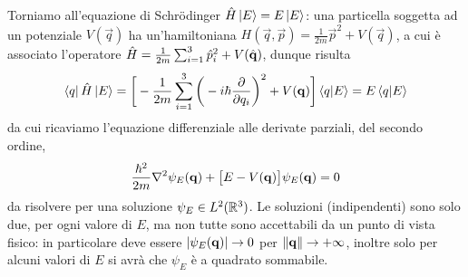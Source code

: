 Torniamo all'equazione di Schr\"odinger $\hat{H}\left|{E}\right\rangle=E\left|{E}\right\rangle$: una particella soggetta ad un potenziale $V(\vec q)$ ha un'hamiltoniana $H(\vec q,\vec p)=\frac1{2m}\vec p^2+V(\vec q)$, a cui è associato l'operatore $\hat{H}=\frac1{2m}\sum_{i=1}^3\hat{p}_i^2+V(\hat{\mathbf{q}})$, dunque risulta
\begin{equation}
	\left\langle{q}\right|\hat{H}\left|{E}\right\rangle=\bigg[-\frac1{2m}\sum_{i=1}^3\bigg(-i\hbar\frac{\partial {}}{\partial {q_i}}\bigg)^2+V(\mathbf{q})\bigg]\left\langle{q}\middle|{E}\right\rangle=E\left\langle{q}\middle|{E}\right\rangle
	\label{eq:hamiltoniano-coordinate}
\end{equation}
da cui ricaviamo l'equazione differenziale alle derivate parziali, del secondo ordine,
\begin{equation}
	\frac{\hbar^2}{2m}\nabla^2\psi_E(\mathbf{q})+\big[E-V(\mathbf{q})\big]\psi_E(\mathbf{q})=0
	\label{eq:schroedinger}
\end{equation}
da risolvere per una soluzione $\psi_E\in L^2(\mathbb{R}^3)$.
Le soluzioni (indipendenti) sono solo due, per ogni valore di $E$, ma non tutte sono accettabili da un punto di vista fisico: in particolare deve essere $\left|{\psi_E(\mathbf{q})}\right|\to 0$ per $\left\|{\mathbf{q}}\right\|\to+\infty$, inoltre solo per alcuni valori di $E$ si avrà che $\psi_E$ è a quadrato sommabile.

